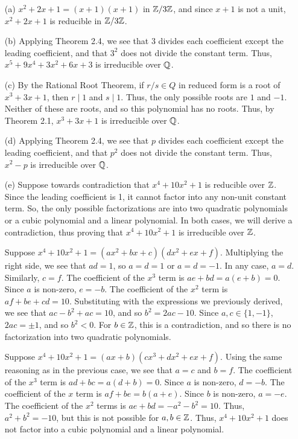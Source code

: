 \documentclass{hmwk}
\begin{document}
\begin{solution}
\begin{itemize}
    \item[(a)] $x^2 + 2x + 1 = (x+1)(x+1)$ in $\mathbb{Z}/3\mathbb{Z}$, and since $x+1$ is not a unit, $x^2 + 2x + 1$ is reducible in $\mathbb{Z}/3\mathbb{Z}$.
    
    \item[(b)] Applying Theorem 2.4, we see that 3 divides each coefficient except the leading coefficient, and that $3^2$ does not divide the constant term. Thus, $x^5 + 9x^4 + 3x^2 + 6x + 3$ is irreducible over $\mathbb{Q}$. 
    
    \item[(c)] By the Rational Root Theorem, if $r/s \in Q$ in reduced form is a root of $x^3 + 3x + 1$, then $r \mid 1$ and $s \mid 1$. Thus, the only possible roots are $1$ and $-1$. Neither of these are roots, and so this polynomial has no roots. Thus, by Theorem 2.1, $x^3 + 3x + 1$ is irreducible over $\mathbb{Q}$. 
    
    \item[(d)] Applying Theorem 2.4, we see that $p$ divides each coefficient except the leading coefficient, and that $p^2$ does not divide the constant term. Thus, $x^2 - p$ is irreducible over $\mathbb{Q}$.
    
    \item[(e)] Suppose towards contradiction that $x^4 + 10x^2 + 1$ is reducible over $\mathbb{Z}$. Since the leading coefficient is 1, it cannot factor into any non-unit constant term. So, the only possible factorizations are into two quadratic polynomials or a cubic polynomial and a linear polynomial. In both cases, we will derive a contradiction, thus proving that $x^4 + 10x^2 + 1$ is irreducible over $\mathbb{Z}$. 

    Suppose $x^4 + 10x^2 + 1 = (ax^2 + bx + c)(dx^2 + ex + f)$. Multiplying the right side, we see that $ad = 1$, so $a = d = 1$ or $a = d = -1$. In any case, $a = d$. Similarly, $c = f$. The coefficient of the $x^3$ term is $ae + bd = a(e + b) = 0$. Since $a$ is non-zero, $e = -b$. The coefficient of the $x^2$ term is $af + be + cd = 10$. Substituting with the expressions we previously derived, we see that $ac - b^2 + ac = 10$, and so $b^2 = 2ac - 10$. Since $a, c \in \{1, -1\}$, $2ac = \pm 1$, and so $b^2 < 0$. For $b \in \mathbb{Z}$, this is a contradiction, and so there is no factorization into two quadratic polynomials. 

    Suppose $x^4 + 10x^2 + 1 = (ax + b)(cx^3 + dx^2 + ex + f)$. Using the same reasoning as in the previous case, we see that $a = c$ and $b = f$. The coefficient of the $x^3$ term is $ad + bc = a(d + b) = 0$. Since $a$ is non-zero, $d = -b$. The coefficient of the $x$ term is $af + be = b(a + e)$. Since $b$ is non-zero, $a = -e$. The coefficient of the $x^2$ terms is $ae + bd = -a^2 - b^2 = 10$. Thus, $a^2 + b^2 = -10$, but this is not possible for $a, b \in \mathbb{Z}$. Thus, $x^4 + 10x^2 + 1$ does not factor into a cubic polynomial and a linear polynomial.


\end{itemize}
\end{solution}
\end{document}
